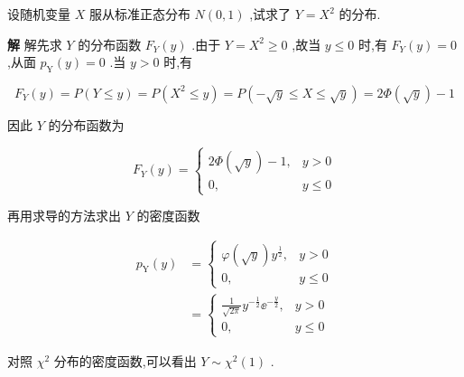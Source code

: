 \begin{example}
	设随机变量 $ X $ 服从标准正态分布 $ N(0,1) $ ,试求了 $ Y=X^{2} $ 的分布.
	
	\textbf{解} 解先求 $ Y $ 的分布函数 $ F_{Y}(y) $ .由于 $ Y=X^{2} \geqslant 0 $ ,故当 $ y \leqslant 0 $ 时,有 $ F_{Y}(y)=0 $ ,从面 $ p_{\mathrm{Y}}(y)=0 $ .当 $ y>0 $ 时,有
	
	\[
	F_{Y}(y)=P(Y \leqslant y)=P\left(X^{2} \leqslant y\right)=P(-\sqrt{y} \leqslant X \leqslant \sqrt{y})=2 \Phi(\sqrt{y})-1
	\]
	
	因此 $ Y $ 的分布函数为
	
	\[
	F_{Y}(y)=\left\{\begin{array}{cl}{2 \Phi(\sqrt{y})-1,} & {y>0} \\ {0,} & {y \leqslant 0}\end{array}\right.
	\]
	
	再用求导的方法求出 $ Y $ 的密度函数
	
	\[
	\begin{array}{ll}
	{p_{\mathrm{Y}}(y)} & {=\left\{
		\begin{array}{ll}
		{\varphi(\sqrt{y}) y^{\frac{1}{2}},} & {y>0} \\ 
		{0,} & {y \leqslant 0}
		\end{array}\right.}\\
	{} & {=\left\{
		\begin{array}{ll}
		{\frac{1}{\sqrt{2 \pi}} y^{-\frac{1}{2}} \ee ^{-\frac{y}{2}},} &  {y>0} \\ 
		{0,} &  {y \leqslant 0}
		\end{array}\right.}
	\end{array}
	\]
	
	对照 $ \chi^{2} $ 分布的密度函数,可以看出 $ Y \sim \chi^{2}(1) $ .	
\end{example}


